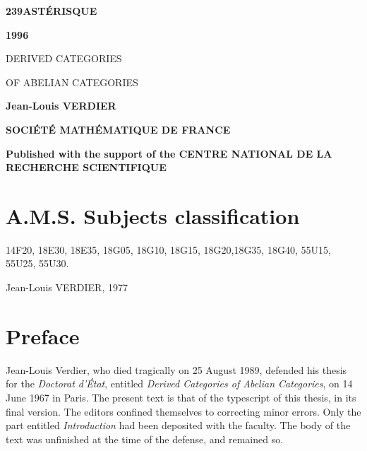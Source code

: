 \begin{titlepage}
  \centering
  {\Huge\bfseries 239\hfill ASTÉRISQUE\par}
  \vspace{1.5em}
  {\LARGE\bfseries 1996\par}
  \vfill
  {\Huge DERIVED CATEGORIES\par}
  \vspace{0.4em}
  {\Huge OF ABELIAN CATEGORIES\par}
  \vspace{3em}
  {\Large\bfseries Jean-Louis VERDIER\par}
  \vfill
  {\Large\bfseries SOCIÉTÉ MATHÉMATIQUE DE FRANCE\par}
  \smallskip
  {\small\bfseries Published with the support of the CENTRE NATIONAL DE LA RECHERCHE SCIENTIFIQUE\par}
\end{titlepage}

\chapter*{A.M.S. Subjects classification}

14F20, 18E30, 18E35, 18G05, 18G10, 18G15, 18G20,18G35,
18G40, 55U15, 55U25, 55U30.

\clearpage
{}
\thispagestyle{empty}
\vspace*{0.62\textheight}
\begin{center}
Jean-Louis VERDIER, 1977
\end{center}

\clearpage
{}
\thispagestyle{empty}
\null
\clearpage

\chapter*{Preface}

Jean-Louis Verdier, who died tragically on 25 August 1989, defended his thesis
for the \emph{Doctorat d'État}, entitled \emph{Derived Categories of Abelian
Categories}, on 14 June 1967 in Paris. The present text is that of the
typescript of this thesis, in its final version. The editors confined
themselves to correcting minor errors. Only the part entitled
\emph{Introduction} had been deposited with the faculty. The body of the text
was unfinished at the time of the defense, and remained so.

